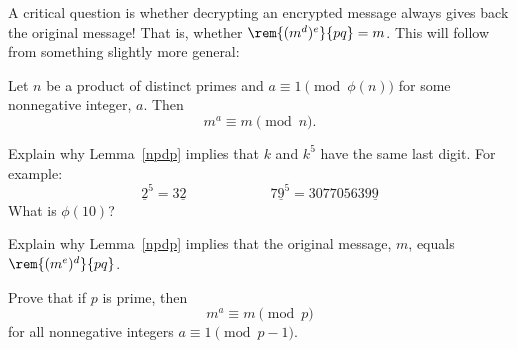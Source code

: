 
\instatements{\newpage}
\begin{problem}
  A critical question is whether decrypting an encrypted message always
  gives back the original message!  That is, whether $\rem{(m^{d})^e}{pq}
  =m$.  This will follow from something slightly more general:
\begin{lemma}\label{npdp}
Let $n$ be a product of distinct primes and $a \equiv 1 \pmod {\phi(n)}$
for some nonnegative integer, $a$.  Then
\begin{equation}\label{ma}
m^a \equiv m \pmod n.
\end{equation}
\end{lemma}

\bparts


\ppart Explain why Lemma~\ref{npdp} implies that $k$ and $k^5$ have the
same last digit.  For example:
%
\[
\underline{2}^5 = 3\underline{2}
\hspace{1in}
7\underline{9}^5 = 307705639\underline{9}
\]
\hint What is $\phi(10)$?


\ppart Explain why Lemma~\ref{npdp} implies that the original message,
$m$, equals $\rem{(m^e)^d}{pq}$.


\eparts

\bparts

\ppart\label{pma} Prove that if $p$ is prime, then
\begin{equation}\label{mp}
m^a \equiv m \pmod{p}
\end{equation}
for all nonnegative integers $a \equiv 1 \pmod {p-1}$.


\end{problem}

